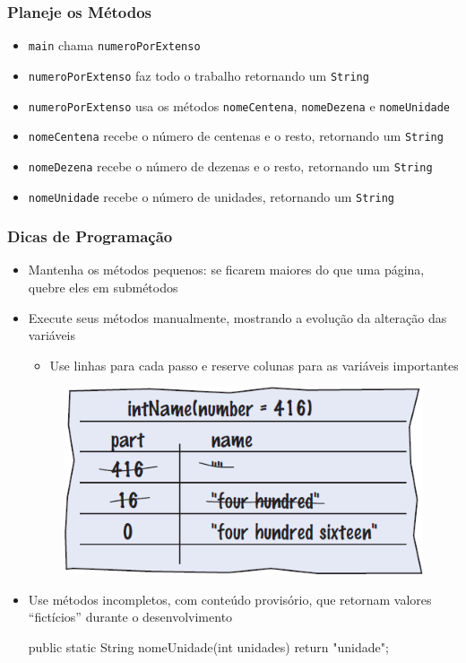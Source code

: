 \documentclass[xcolor={dvipsnames,table},aspectratio=169]{beamer}
\begin{document}
\begin{frame}\frametitle{Planeje os Métodos}
\begin{itemize}
	\item \texttt{main} chama \texttt{numeroPorExtenso}
	\item \texttt{numeroPorExtenso} faz todo o trabalho retornando um \texttt{String}
	\item \texttt{numeroPorExtenso} usa os métodos \texttt{nomeCentena}, \texttt{nomeDezena} e \texttt{nomeUnidade}
	\item \texttt{nomeCentena} recebe o número de centenas e o resto, retornando um \texttt{String}
	\item \texttt{nomeDezena} recebe o número de dezenas e o resto, retornando um \texttt{String}
	\item \texttt{nomeUnidade} recebe o número de unidades, retornando um \texttt{String}
\end{itemize}
\end{frame}

\begin{frame}[fragile]\frametitle{Dicas de Programação}
\begin{itemize}
	\item Mantenha os métodos pequenos: se ficarem maiores do que uma página, quebre eles em submétodos
	\item Execute seus métodos manualmente, mostrando a evolução da alteração das variáveis
	\begin{itemize}
		\item Use linhas para cada passo e reserve colunas para as variáveis importantes 
	\end{itemize}
\begin{figure}[h]
	\includegraphics[height=0.15\paperheight,center]{pucrs-ep-fprog-unidade_05-metodos-laminas-teste_de_mesa.png}
\end{figure}
	\item Use métodos incompletos, com conteúdo provisório, que retornam valores ``fictícios'' durante o desenvolvimento
\begin{javacode}
public static String nomeUnidade(int unidades) {
   return "unidade";
}
\end{javacode}
\end{itemize}
\end{frame}
\end{document}
